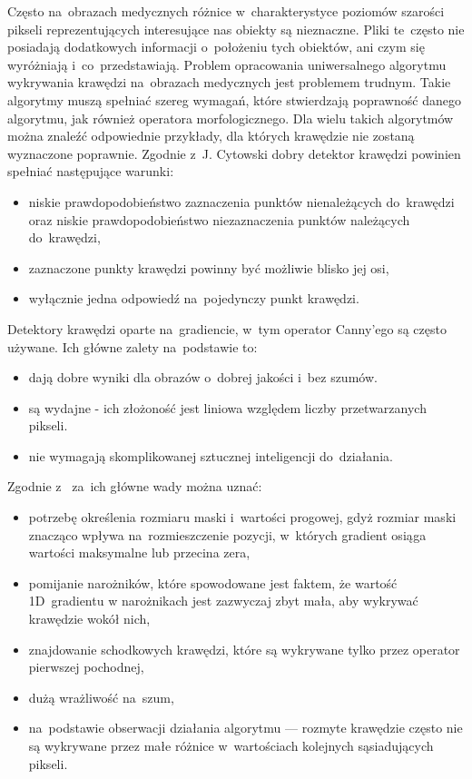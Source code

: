 \documentclass[a4paper,11pt,twoside,openright]{report}
\theoremstyle{definition}
\begin{document}
Często na~obrazach medycznych różnice w~charakterystyce poziomów szarości pikseli
reprezentujących interesujące nas obiekty są nieznaczne. Pliki te~często nie posiadają
dodatkowych informacji o~położeniu tych obiektów, ani czym się wyróżniają i~co~przedstawiają.
Problem opracowania uniwersalnego algorytmu wykrywania krawędzi na~obrazach medycznych
jest problemem trudnym. Takie algorytmy muszą spełniać szereg wymagań,
które stwierdzają poprawność danego algorytmu, jak również operatora morfologicznego.
Dla wielu takich algorytmów można znaleźć odpowiednie przykłady,
dla których krawędzie nie zostaną wyznaczone poprawnie. Zgodnie z~J. Cytowski \cite{Cyfrowe przetwarzanie
obrazów medycznych} dobry detektor krawędzi powinien spełniać następujące warunki:
\begin{itemize}[noitemsep]
\item {niskie prawdopodobieństwo zaznaczenia punktów nienależących do~krawędzi
oraz niskie prawdopodobieństwo niezaznaczenia punktów należących do~krawędzi,}
\item {zaznaczone punkty krawędzi powinny być możliwie blisko jej osi,}
\item {wyłącznie jedna odpowiedź na~pojedynczy punkt krawędzi.}
\end{itemize}

Detektory krawędzi oparte na~gradiencie, w~tym operator Canny'ego są często używane.
Ich główne zalety na~podstawie \cite{Cyfrowe przetwarzanie obrazów medycznych} to:
\begin{itemize}[noitemsep]
\item dają dobre wyniki dla obrazów o~dobrej jakości i~bez szumów.
\item są wydajne - ich złożoność jest liniowa względem liczby przetwarzanych pikseli.
\item nie wymagają skomplikowanej sztucznej inteligencji do~działania.
\end{itemize}

Zgodnie z~\cite{Cyfrowe przetwarzanie obrazów medycznych} za~ich główne wady można uznać:
\begin{itemize}[noitemsep]
\item potrzebę określenia rozmiaru maski i~wartości progowej, gdyż rozmiar maski
znacząco wpływa na~rozmieszczenie pozycji, w~których gradient osiąga wartości
maksymalne lub przecina zera,
\item pomijanie narożników, które spowodowane jest faktem, że wartość 1D~gradientu
w narożnikach jest zazwyczaj zbyt mała, aby wykrywać krawędzie wokół nich,
\item znajdowanie schodkowych krawędzi, które są wykrywane tylko przez operator pierwszej pochodnej,
\item dużą wrażliwość na~szum,
\item na~podstawie obserwacji działania algorytmu --- rozmyte krawędzie często
nie są wykrywane przez małe różnice w~wartościach kolejnych sąsiadujących pikseli.
\end{itemize}
\end{document}
